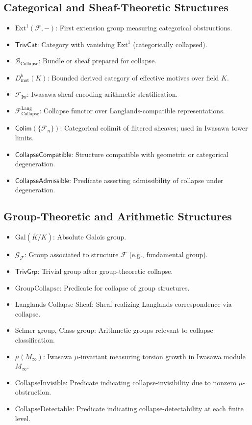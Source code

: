 \documentclass[11pt]{article}
\begin{document}
\subsection*{Categorical and Sheaf-Theoretic Structures}

\begin{itemize}
  \item $\mathrm{Ext}^1(\mathcal{F}, -)$: First extension group measuring categorical obstructions.
  \item $\mathsf{TrivCat}$: Category with vanishing $\mathrm{Ext}^1$ (categorically collapsed).
  \item $\mathcal{B}_{\mathrm{Collapse}}$: Bundle or sheaf prepared for collapse.
  \item $D^b_{\mathrm{mot}}(K)$: Bounded derived category of effective motives over field $K$.
  \item $\mathcal{F}_{\mathrm{Iw}}$: Iwasawa sheaf encoding arithmetic stratification.
  \item $\mathcal{F}_{\mathrm{Collapse}}^{\mathrm{Lang}}$: Collapse functor over Langlands-compatible representations.
  \item $\mathsf{Colim}(\{\mathcal{F}_n\})$: Categorical colimit of filtered sheaves; used in Iwasawa tower limits.
  \item $\mathsf{CollapseCompatible}$: Structure compatible with geometric or categorical degeneration.
  \item $\mathsf{CollapseAdmissible}$: Predicate asserting admissibility of collapse under degeneration.
\end{itemize}

\subsection*{Group-Theoretic and Arithmetic Structures}

\begin{itemize}
  \item $\mathrm{Gal}(\overline{K}/K)$: Absolute Galois group.
  \item $\mathcal{G}_{\mathcal{F}}$: Group associated to structure $\mathcal{F}$ (e.g., fundamental group).
  \item $\mathsf{TrivGrp}$: Trivial group after group-theoretic collapse.
  \item $\mathrm{GroupCollapse}$: Predicate for collapse of group structures.
  \item Langlands Collapse Sheaf: Sheaf realizing Langlands correspondence via collapse.
  \item Selmer group, Class group: Arithmetic groups relevant to collapse classification.
  \item $\mu(M_\infty)$: Iwasawa $\mu$-invariant measuring torsion growth in Iwasawa module $M_\infty$.
  \item $\mathrm{CollapseInvisible}$: Predicate indicating collapse-invisibility due to nonzero $\mu$-obstruction.
  \item $\mathrm{CollapseDetectable}$: Predicate indicating collapse-detectability at each finite level.
\end{itemize}
\end{document}

